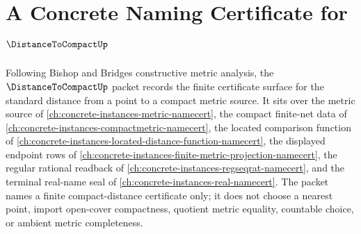\chapter{A Concrete Naming Certificate for $\DistanceToCompactUp$}
\label{ch:concrete-instances-distance-to-compact-namecert}

Following Bishop and Bridges constructive metric analysis, the $\DistanceToCompactUp$ packet records the finite certificate surface for the standard distance from a point to a compact metric source. It sits over the metric source of \autoref{ch:concrete-instances-metric-namecert}, the compact finite-net data of \autoref{ch:concrete-instances-compactmetric-namecert}, the located comparison function of \autoref{ch:concrete-instances-located-distance-function-namecert}, the displayed endpoint rows of \autoref{ch:concrete-instances-finite-metric-projection-namecert}, the regular rational readback of \autoref{ch:concrete-instances-regseqrat-namecert}, and the terminal real-name seal of \autoref{ch:concrete-instances-real-namecert}. The packet names a finite compact-distance certificate only; it does not choose a nearest point, import open-cover compactness, quotient metric equality, countable choice, or ambient metric completeness.

